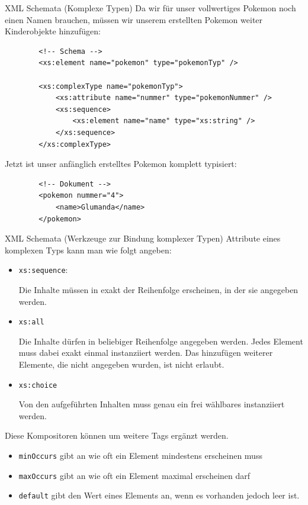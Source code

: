 \begin{example}{XML Schemata (Komplexe Typen)}
    Da wir für unser vollwertiges Pokemon noch einen Namen brauchen, müssen wir unserem erstellten Pokemon weiter Kinderobjekte hinzufügen:

    \begin{lstlisting}
        <!-- Schema -->
        <xs:element name="pokemon" type="pokemonTyp" />

        <xs:complexType name="pokemonTyp">
            <xs:attribute name="nummer" type="pokemonNummer" />
            <xs:sequence>
                <xs:element name="name" type="xs:string" />
            </xs:sequence>
        </xs:complexType>
    \end{lstlisting}

    Jetzt ist unser anfänglich erstelltes Pokemon komplett typisiert:

    \begin{lstlisting}
        <!-- Dokument -->
        <pokemon nummer="4">
            <name>Glumanda</name>
        </pokemon>
    \end{lstlisting}
\end{example}

\begin{bonus}{XML Schemata (Werkzeuge zur Bindung komplexer Typen)}
    Attribute eines komplexen Typs kann man wie folgt angeben:

    \begin{itemize}
        \item \texttt{xs:sequence}:

              Die Inhalte müssen in exakt der Reihenfolge erscheinen, in der sie angegeben werden.
        \item \texttt{xs:all}

              Die Inhalte dürfen in beliebiger Reihenfolge angegeben werden.
              Jedes Element muss dabei exakt einmal instanziiert werden.
              Das hinzufügen weiterer Elemente, die nicht angegeben wurden, ist nicht erlaubt.
        \item \texttt{xs:choice}

              Von den aufgeführten Inhalten muss genau ein frei wählbares instanziiert werden.
    \end{itemize}

    Diese Kompositoren können um weitere Tags ergänzt werden.

    \begin{itemize}
        \item \texttt{minOccurs} gibt an wie oft ein Element mindestens erscheinen muss
        \item \texttt{maxOccurs} gibt an wie oft ein Element maximal erscheinen darf
        \item \texttt{default} gibt den Wert eines Elements an, wenn es vorhanden jedoch leer ist.
    \end{itemize}
\end{bonus}

